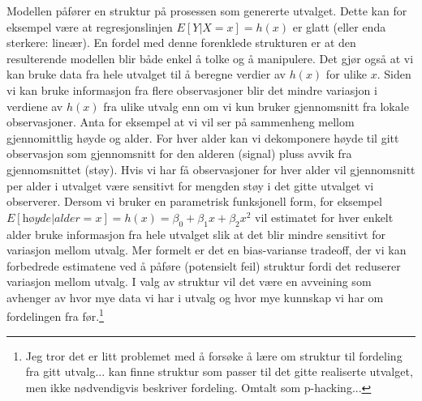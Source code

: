 Modellen påfører en struktur på prosessen som genererte utvalget. Dette kan for eksempel være at regresjonslinjen $E[Y|X=x]=h(x)$ er glatt (eller enda sterkere: lineær). En fordel med denne forenklede strukturen er at den resulterende modellen blir både enkel å tolke og å manipulere. Det gjør også at vi kan bruke data fra hele utvalget til å beregne verdier av $h(x)$ for ulike $x$. Siden vi kan bruke informasjon fra flere observasjoner blir det mindre variasjon i verdiene av $h(x)$ fra ulike utvalg enn om vi kun bruker gjennomsnitt fra lokale observasjoner. Anta for eksempel at vi vil ser på sammenheng mellom gjennomittlig høyde og alder. For hver alder kan vi dekomponere høyde til gitt observasjon som gjennomsnitt for den alderen (signal) pluss avvik fra gjennomsnittet (støy). Hvis vi har få observasjoner for hver alder vil gjennomsnitt per alder i utvalget være sensitivt for mengden støy i det gitte utvalget vi observerer. Dersom vi bruker en parametrisk funksjonell form, for eksempel $E[\textit{høyde}|\textit{alder}=x]=h(x) = \beta_0 + \beta_1x+\beta_2 x^2$ vil estimatet for hver enkelt alder bruke informasjon fra hele utvalget slik at det blir mindre sensitivt for variasjon mellom utvalg. Mer formelt er det en bias-varianse tradeoff, der vi kan forbedrede estimatene ved å påføre (potensielt feil) struktur fordi det reduserer variasjon mellom utvalg. I valg av struktur vil det være en avveining som avhenger av hvor mye data vi har i utvalg og hvor mye kunnskap vi har om fordelingen fra før.\footnote{Jeg tror det er litt problemet med å forsøke å lære om struktur til fordeling fra gitt utvalg... kan finne struktur som passer til det gitte realiserte utvalget, men ikke nødvendigvis beskriver fordeling. Omtalt som p-hacking...}

